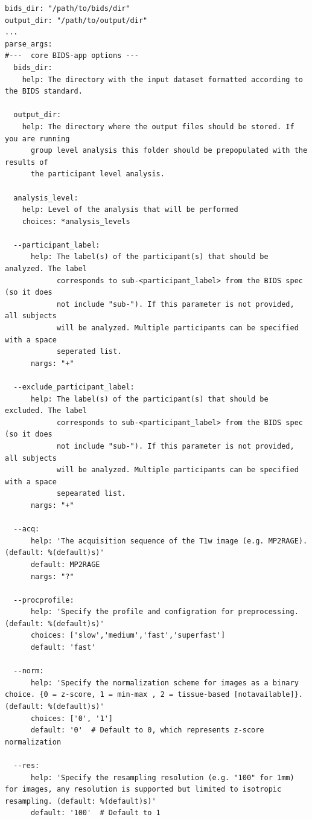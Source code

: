\begin{verbatim}
bids_dir: "/path/to/bids/dir"
output_dir: "/path/to/output/dir"
...
parse_args:
#---  core BIDS-app options ---
  bids_dir:
    help: The directory with the input dataset formatted according to the BIDS standard.
  
  output_dir:
    help: The directory where the output files should be stored. If you are running
      group level analysis this folder should be prepopulated with the results of
      the participant level analysis.
      
  analysis_level:
    help: Level of the analysis that will be performed
    choices: *analysis_levels

  --participant_label:
      help: The label(s) of the participant(s) that should be analyzed. The label
            corresponds to sub-<participant_label> from the BIDS spec (so it does
            not include "sub-"). If this parameter is not provided, all subjects
            will be analyzed. Multiple participants can be specified with a space
            seperated list.
      nargs: "+"

  --exclude_participant_label:
      help: The label(s) of the participant(s) that should be excluded. The label
            corresponds to sub-<participant_label> from the BIDS spec (so it does
            not include "sub-"). If this parameter is not provided, all subjects
            will be analyzed. Multiple participants can be specified with a space
            sepearated list.
      nargs: "+"

  --acq:
      help: 'The acquisition sequence of the T1w image (e.g. MP2RAGE). (default: %(default)s)'
      default: MP2RAGE
      nargs: "?"

  --procprofile:
      help: 'Specify the profile and configration for preprocessing. (default: %(default)s)'
      choices: ['slow','medium','fast','superfast']
      default: 'fast'

  --norm:
      help: 'Specify the normalization scheme for images as a binary choice. {0 = z-score, 1 = min-max , 2 = tissue-based [notavailable]}. (default: %(default)s)'
      choices: ['0', '1']
      default: '0'  # Default to 0, which represents z-score normalization

  --res:
      help: 'Specify the resampling resolution (e.g. "100" for 1mm) for images, any resolution is supported but limited to isotropic resampling. (default: %(default)s)'
      default: '100'  # Default to 1 
    

\end{verbatim}

